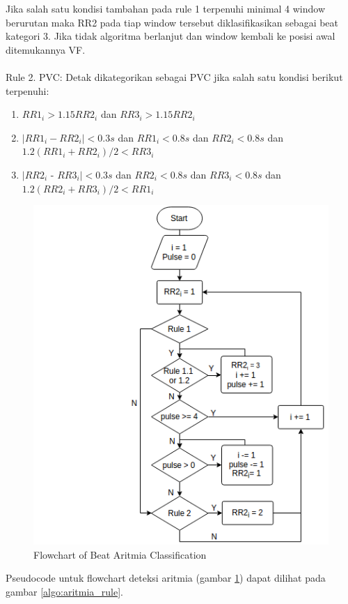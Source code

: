 Jika salah satu kondisi tambahan pada rule 1 terpenuhi minimal 4 window berurutan maka RR2 pada tiap window tersebut diklasifikasikan sebagai beat kategori 3. Jika tidak algoritma berlanjut dan window kembali ke posisi awal ditemukannya VF.
\\
\\
Rule 2. PVC: Detak dikategorikan sebagai PVC jika salah satu kondisi berikut terpenuhi:

\begin{enumerate}
	\item $RR1_i > 1.15RR2_i$ dan $RR3_i > 1.15RR2_i$
	\item $|RR1_i - RR2_i| < 0.3s$ dan $RR1_i < 0.8s$ dan $RR2_i < 0.8s$ dan $1.2(RR1_i + RR2_i)/2 < RR3_i$
	\item $|RR2_i$ - $RR3_i| < 0.3s$ dan $RR2_i < 0.8s$ dan $RR3_i < 0.8s$ dan $1.2(RR2_i + RR3_i)/2 < RR1_i$
\end{enumerate}

\begin{figure}[htbp]
\centerline{\includegraphics[scale=0.7]{images/flowchart_aritmia.png}}
\caption{Flowchart of Beat Aritmia Classification}
\label{fig:flowchart_aritmia}
\end{figure}

Pseudocode untuk flowchart deteksi aritmia (gambar \ref{fig:flowchart_aritmia}) dapat dilihat pada gambar \ref{algo:aritmia_rule}.

